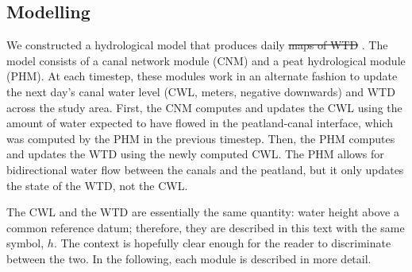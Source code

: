 \documentclass[bg, manuscript]{copernicus}
\providecommand{\DIFadd}[1]{{\protect\color{blue}\uwave{#1}}} %
\providecommand{\DIFdel}[1]{{\protect\color{red}\sout{#1}}}                      %
\providecommand{\DIFaddbegin}{} %
\providecommand{\DIFaddend}{} %
\providecommand{\DIFdelbegin}{} %
\providecommand{\DIFdelend}{} %
\begin{document}
\begin{figure}[H]
\label{fig:study_area}
\end{figure}   

    
\subsection{Modelling}
We constructed a hydrological model that produces daily \DIFdelbegin \DIFdel{maps of WTD }\DIFdelend \DIFaddbegin \DIFadd{WTD maps}\DIFaddend .
The model consists of a canal network module (CNM) and a peat hydrological module (PHM).
At each timestep, these modules work in an alternate fashion to update the next day’s canal water level (CWL, meters, negative downwards) and WTD across the study area.
First, the CNM computes and updates the CWL using the amount of water expected to have flowed in the peatland-canal interface, which was computed by the PHM in the previous timestep.
Then, the PHM computes and updates the WTD using the newly computed CWL.
The PHM allows for bidirectional water flow between the canals and the peatland, but it only updates the state of the WTD, not the CWL.

The CWL and the WTD are essentially the same quantity: water height above a common reference datum; therefore, they are described in this text with the same symbol, $h$.
The context is hopefully clear enough for the reader to discriminate between the two.
In the following, each module is described in more detail.
\end{document}
